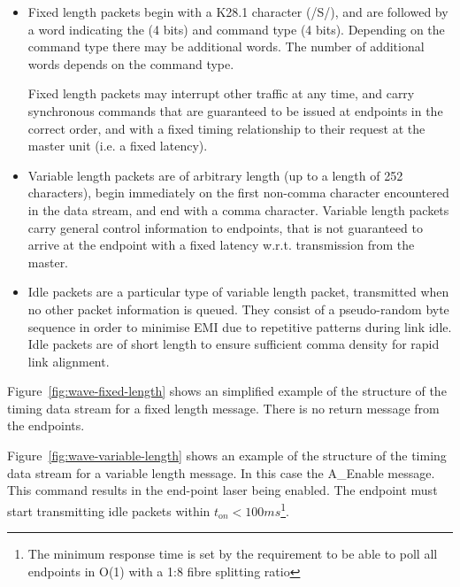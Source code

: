 \documentclass{dune}
\begin{document}
\begin{itemize}
	\item Fixed length packets begin with a K28.1 character (/S/), and are followed by a word indicating the  (4 bits) and command type (4 bits). Depending on the command type there may be additional words. The number of additional words depends on the command type.
	 
	 Fixed length packets may interrupt other traffic at any time, and carry synchronous commands that are guaranteed to be issued at endpoints in the correct order, and with a fixed timing relationship to their request at the master unit (i.e. a fixed latency).
	\item Variable length packets are of arbitrary length (up to a length of 252 characters), begin immediately on the first non-comma character encountered in the data stream, and end with a comma character. Variable length packets carry general control information to endpoints, that is not guaranteed to arrive at the endpoint with a fixed latency w.r.t. transmission from the master.
	\item Idle packets are a particular type of variable length packet, transmitted when no other packet information is queued. They consist of a pseudo-random byte sequence in order to minimise EMI due to repetitive patterns during link idle. Idle packets are of short length to ensure sufficient comma density for rapid link alignment.
\end{itemize}

Figure~\ref{fig:wave-fixed-length} shows an simplified example of the structure of the timing data stream for a fixed length message. There is no return message from the endpoints. 

Figure~\ref{fig:wave-variable-length} shows an example of the structure of the timing data stream for a variable length message. In this case the A\_Enable message. This command results in the end-point laser being enabled. The endpoint must start transmitting idle packets within $t_{\mathrm on} < 100 ms$\footnote{The minimum response time is set by the requirement to be able to poll all endpoints in O(1) with a 1:8 fibre splitting ratio}. 
\end{document}
